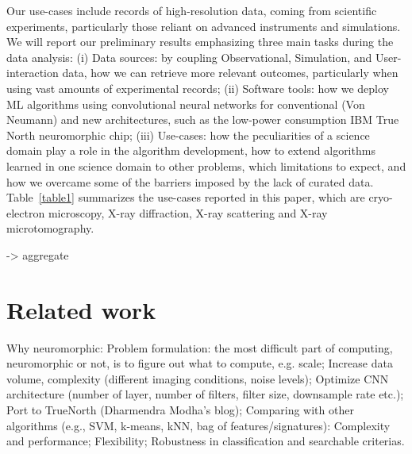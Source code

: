 Our use-cases include records of high-resolution data, coming from scientific experiments, particularly those reliant on advanced instruments and simulations. We will report our preliminary results emphasizing three main tasks during the data analysis:
(i) Data sources: by coupling Observational, Simulation, and User-interaction data, how we can retrieve more relevant outcomes, particularly when using vast amounts of experimental records; (ii) Software tools: how we deploy ML algorithms using convolutional neural networks for conventional (Von Neumann) and new architectures, such as the low-power consumption IBM True
North neuromorphic chip;
(iii) Use-cases: how the peculiarities of a science domain play a role in the algorithm development, how to extend algorithms learned in one science domain to other problems, which limitations to expect, and how we overcame some of the barriers imposed by the lack of curated data. Table~\ref{table1} summarizes the use-cases reported in this paper, which are cryo-electron microscopy, X-ray diffraction, X-ray scattering and X-ray microtomography.



-> aggregate



\section{Related work}
Why neuromorphic:
Problem formulation: the most difficult part of computing, neuromorphic or not, is to figure out what to compute, e.g. scale;
Increase data volume, complexity (different imaging conditions, noise levels);
Optimize CNN architecture (number of layer, number of filters, filter size, downsample rate etc.);
Port to TrueNorth (Dharmendra Modha’s blog);
Comparing with other algorithms (e.g., SVM, k-means, kNN, bag of features/signatures):
Complexity and performance;
Flexibility;
Robustness in classification and searchable criterias.
